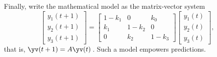 Finally, write the mathematical model as the matrix-vector system 
\begin{equation*}
\begin{bmatrix} y_1(t+1)\\y_2(t+1)\\y_3(t+1) \end{bmatrix}
=\begin{bmatrix} 1-k_1&0&k_0
\\k_1&1-k_2&0
\\0&k_2&1-k_3 \end{bmatrix}
\begin{bmatrix} y_1(t)\\y_2(t)\\y_3(t) \end{bmatrix},
\end{equation*}
that is, \(\yv(t+1)=A\yv(t)\)\,.
Such a model empowers predictions.



